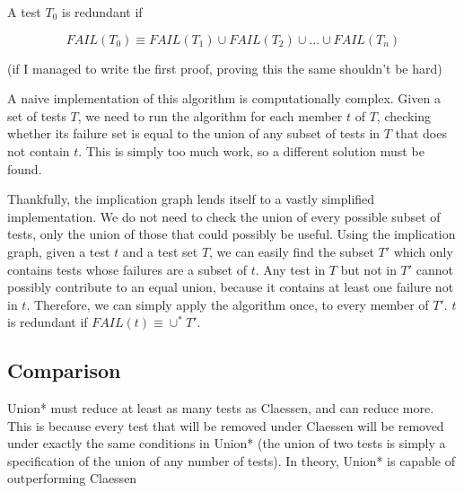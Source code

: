 \documentclass[11pt,twoside]{article}
\newcommand\fail{\mathit{FAIL}}
\begin{document}
A test $T_0$ is redundant if

$$\fail (T_0) \equiv \fail(T_1) \cup \fail(T_2) \cup ... \cup \fail(T_n) $$

(if I managed to write the first proof, proving this the same shouldn't be hard)

A naive implementation of this algorithm is computationally complex. Given a set of tests $T$, we need to run the algorithm for each member $t$ of $T$, checking whether its failure set is equal to the union of any subset of tests in $T$ that does not contain $t$. This is simply too much work, so a different solution must be found.

Thankfully, the implication graph lends itself to a vastly simplified implementation. We do not need to check the union of every possible subset of tests, only the union of those that could possibly be useful. Using the implication graph, given a test $t$ and a test set $T$, we can easily find the subset $T'$ which only contains tests whose failures are a subset of $t$. Any test in $T$ but not in $T'$ cannot possibly contribute to an equal union, because it contains at least one failure not in $t$. Therefore, we can simply apply the algorithm once, to every member of $T'$. $t$ is redundant if $FAIL(t) \equiv \cup^* T'$.

\subsection{Comparison}
Union* must reduce at least as many tests as Claessen, and can reduce more. This is because every test that will be removed under Claessen will be removed under exactly the same conditions in Union* (the union of two tests is simply a specification of the union of any number of tests). In theory, Union* is capable of outperforming Claessen
\end{document}
